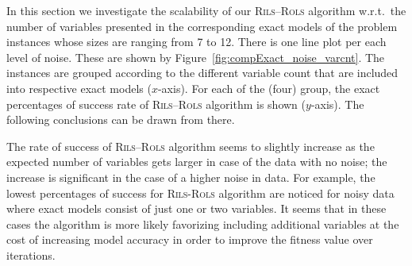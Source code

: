 \documentclass[a4paper,12pt]{elsarticle}
\begin{document}
\begin{center}
	\label{fig:compR2_noise_size}
\end{center}


In this section we investigate the  scalability of our \textsc{Rils}--\textsc{Rols} algorithm w.r.t.\ the number of variables presented in the corresponding exact models of the problem instances whose sizes are ranging from 7 to 12. There is one line plot per each level of noise.  These are shown by Figure~\ref{fig:compExact_noise_varcnt}. The instances are grouped according to the different variable count that are included into respective exact models ($x$-axis). For each of the (four) group, the exact percentages of success rate of \textsc{Rils}--\textsc{Rols} algorithm is shown ($y$-axis). The following conclusions can be drawn from there.

The rate of success of \textsc{Rils}--\textsc{Rols} algorithm seems to slightly increase as the expected number of variables gets larger in case of the data with no noise;
	the increase is significant in the case of a higher noise in data. For example, the lowest percentages of success for \textsc{Rils}-\textsc{Rols} algorithm are noticed for noisy data where exact models consist of just one or two variables. It seems that in these cases the algorithm is more likely favorizing including additional variables at the cost of increasing model accuracy  in order to improve the fitness value over iterations. %
\end{document}
